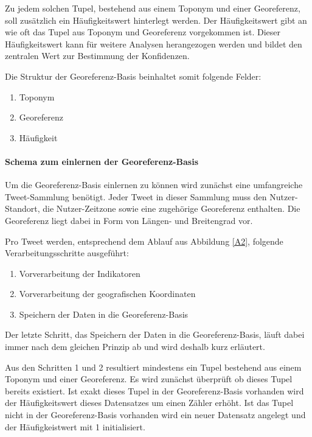 						Zu jedem solchen Tupel, bestehend aus einem Toponym und einer Georeferenz, soll zusätzlich ein Häufigkeitswert hinterlegt werden.
						Der Häufigkeitswert gibt an wie oft das Tupel aus Toponym und Georeferenz vorgekommen ist.
						Dieser Häufigkeitswert kann für weitere Analysen herangezogen werden und bildet den zentralen Wert zur Bestimmung der Konfidenzen. 

						Die Struktur der Georeferenz-Basis beinhaltet somit folgende Felder:

						\begin{enumerate}
							\item Toponym
							\item Georeferenz  
							\item Häufigkeit 
						\end{enumerate}

					\paragraph{Schema zum einlernen der Georeferenz-Basis}
						
						Um die Georeferenz-Basis einlernen zu können wird zunächst eine umfangreiche Tweet-Sammlung benötigt.
						Jeder Tweet in dieser Sammlung muss den Nutzer-Standort, die Nutzer-Zeitzone sowie eine zugehörige Georeferenz enthalten.
						Die Georeferenz liegt dabei in Form von Längen- und Breitengrad vor. 
						
						Pro Tweet werden, entsprechend dem Ablauf aus Abbildung \ref{A2}, folgende Verarbeitungsschritte ausgeführt:

						\begin{enumerate}
							\item Vorverarbeitung der Indikatoren
							\item Vorverarbeitung der geografischen Koordinaten
							\item Speichern der Daten in die Georeferenz-Basis
						\end{enumerate}

						Der letzte Schritt, das Speichern der Daten in die Georeferenz-Basis, läuft dabei immer nach dem gleichen Prinzip ab und wird deshalb kurz erläutert.
						
						Aus den Schritten 1 und 2 resultiert mindestens ein Tupel bestehend aus einem Toponym und einer Georeferenz. 
						Es wird zunächst überprüft ob dieses Tupel bereits existiert.
						Ist exakt dieses Tupel in der Georeferenz-Basis vorhanden wird der Häufigkeitswert dieses Datensatzes um einen Zähler erhöht.
						Ist das Tupel nicht in der Georeferenz-Basis vorhanden wird ein neuer Datensatz angelegt und der Häufigkeistwert mit 1 initialisiert.

